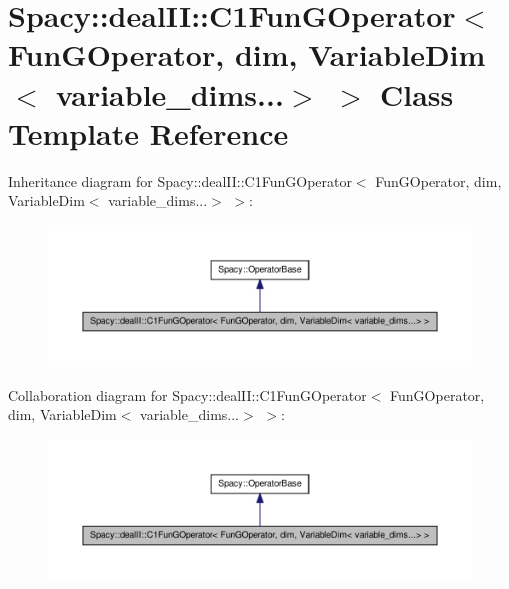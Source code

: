 \hypertarget{classSpacy_1_1dealII_1_1C1FunGOperator_3_01FunGOperator_00_01dim_00_01VariableDim_3_01variable__dims_8_8_8_4_01_4}{\section{\-Spacy\-:\-:deal\-I\-I\-:\-:\-C1\-Fun\-G\-Operator$<$ \-Fun\-G\-Operator, dim, \-Variable\-Dim$<$ variable\-\_\-dims...$>$ $>$ \-Class \-Template \-Reference}
\label{classSpacy_1_1dealII_1_1C1FunGOperator_3_01FunGOperator_00_01dim_00_01VariableDim_3_01variable__dims_8_8_8_4_01_4}
}


\-Inheritance diagram for \-Spacy\-:\-:deal\-I\-I\-:\-:\-C1\-Fun\-G\-Operator$<$ \-Fun\-G\-Operator, dim, \-Variable\-Dim$<$ variable\-\_\-dims...$>$ $>$\-:
\nopagebreak
\begin{figure}[H]
\begin{center}
\leavevmode
\includegraphics[width=350pt]{classSpacy_1_1dealII_1_1C1FunGOperator_3_01FunGOperator_00_01dim_00_01VariableDim_3_01variable__6cd9ff2446aa850f90d8e6b072b74f9a}
\end{center}
\end{figure}


\-Collaboration diagram for \-Spacy\-:\-:deal\-I\-I\-:\-:\-C1\-Fun\-G\-Operator$<$ \-Fun\-G\-Operator, dim, \-Variable\-Dim$<$ variable\-\_\-dims...$>$ $>$\-:
\nopagebreak
\begin{figure}[H]
\begin{center}
\leavevmode
\includegraphics[width=350pt]{classSpacy_1_1dealII_1_1C1FunGOperator_3_01FunGOperator_00_01dim_00_01VariableDim_3_01variable__dims_8_8_8_4_01_4__coll__graph}
\end{center}
\end{figure}
